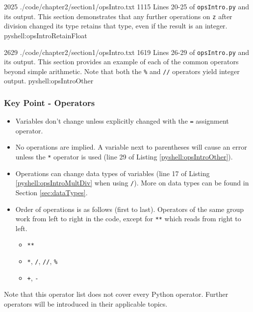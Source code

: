 \documentclass[oneside]{book}
\begin{document}
{20}{25}
{./code/chapter2/section1/opsIntro.txt}
{11}{15}
{Lines 20-25 of \texttt{opsIntro.py} and its output. This section demonstrates that any further operations on \texttt{z} after division changed its type retains that type, even if the result is an integer.}
{pyshell:opsIntroRetainFloat}

{26}{29}
{./code/chapter2/section1/opsIntro.txt}
{16}{19}
{Lines 26-29 of \texttt{opsIntro.py} and its output. This section provides an example of each of the common operators beyond simple arithmetic. Note that both the \texttt{\%} and \texttt{//} operators yield integer output.}
{pyshell:opsIntroOther}

\FloatBarrier

\subsubsection*{Key Point - Operators}
\begin{itemize}
\item Variables don't change unless explicitly changed with the \texttt{=} assignment operator.
\item No operations are implied. A variable next to parentheses will cause an error unless the \texttt{*} operator is used (line 29 of Listing \ref{pyshell:opsIntroOther}).
\item Operations can change data types of variables (line 17 of Listing \ref{pyshell:opsIntroMultDiv} when using \texttt{/}). More on data types can be found in Section \ref{sec:dataTypes}.
\item Order of operations is as follows (first to last). Operators of the same group work from left to right in the code, except for \texttt{**} which reads from right to left.
	\begin{itemize}
	\item[] \texttt{**}
	\item[] \texttt{*}, \texttt{/}, \texttt{//}, \texttt{\%}
	\item[] \texttt{+}, \texttt{-}
	\end{itemize}
\end{itemize}
Note that this operator list does not cover every Python operator. Further operators will be introduced in their applicable topics.
\end{document}
